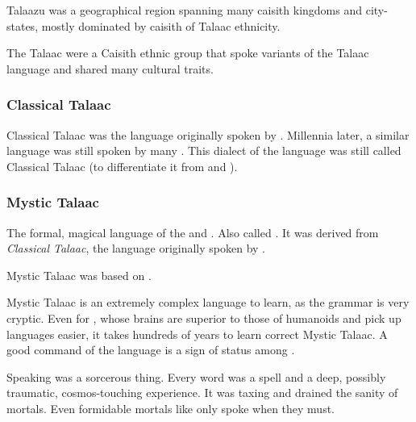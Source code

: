 Talaazu was a geographical region spanning many caisith kingdoms and city-states, mostly dominated by caisith of Talaac ethnicity. 

The Talaac were a Caisith ethnic group that spoke variants of the Talaac language and shared many cultural traits. 









\subsubsection{Classical Talaac}
Classical Talaac was the language originally spoken by .
Millennia later, a similar language was still spoken by many \ophidians. 
This  dialect of the language was still called Classical Talaac (to differentiate it from  and ).





\subsubsection{Mystic Talaac}
\index{\TrueDraconic}
The formal, magical language of the \dragons and \ophidians.
Also called \emph{\TrueDraconic}. 
It was derived from \emph{Classical Talaac}, the language originally spoken by . 

Mystic Talaac was based on . 

Mystic Talaac is an extremely complex language to learn, as the grammar is very cryptic. 
Even for \dragons{}, whose brains are superior to those of humanoids and pick up languages easier, it takes hundreds of years to learn correct Mystic Talaac. 
A good command of the language is a sign of status among \dragons{}. 

Speaking \TrueDraconic was a sorcerous thing. 
Every word was a spell and a deep, possibly traumatic, cosmos-touching experience.
It was taxing and drained the sanity of mortals. 
Even formidable mortals like \Criseis only spoke \TrueDraconic when they must.

